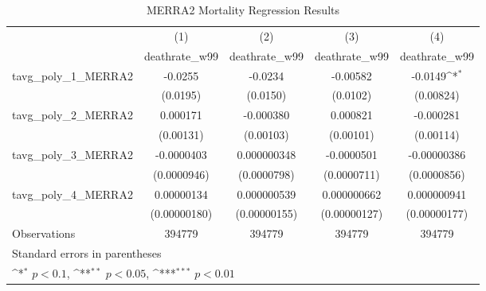 \begin{table}[htbp]\centering
\def\sym#1{\ifmmode^{#1}\else\(^{#1}\)\fi}
\caption{MERRA2 Mortality Regression Results}
\begin{tabular}{l*{4}{c}}
\hline\hline
                    &\multicolumn{1}{c}{(1)}&\multicolumn{1}{c}{(2)}&\multicolumn{1}{c}{(3)}&\multicolumn{1}{c}{(4)}\\
                    &\multicolumn{1}{c}{deathrate\_w99}&\multicolumn{1}{c}{deathrate\_w99}&\multicolumn{1}{c}{deathrate\_w99}&\multicolumn{1}{c}{deathrate\_w99}\\
\hline
tavg\_poly\_1\_MERRA2  &     -0.0255         &     -0.0234         &    -0.00582         &     -0.0149\sym{*}  \\
                    &    (0.0195)         &    (0.0150)         &    (0.0102)         &   (0.00824)         \\
[1em]
tavg\_poly\_2\_MERRA2  &    0.000171         &   -0.000380         &    0.000821         &   -0.000281         \\
                    &   (0.00131)         &   (0.00103)         &   (0.00101)         &   (0.00114)         \\
[1em]
tavg\_poly\_3\_MERRA2  &  -0.0000403         & 0.000000348         &  -0.0000501         & -0.00000386         \\
                    & (0.0000946)         & (0.0000798)         & (0.0000711)         & (0.0000856)         \\
[1em]
tavg\_poly\_4\_MERRA2  &  0.00000134         & 0.000000539         & 0.000000662         & 0.000000941         \\
                    &(0.00000180)         &(0.00000155)         &(0.00000127)         &(0.00000177)         \\
\hline
Observations        &      394779         &      394779         &      394779         &      394779         \\
\hline\hline
\multicolumn{5}{l}{\footnotesize Standard errors in parentheses}\\
\multicolumn{5}{l}{\footnotesize \sym{*} \(p<0.1\), \sym{**} \(p<0.05\), \sym{***} \(p<0.01\)}\\
\end{tabular}
\end{table}
